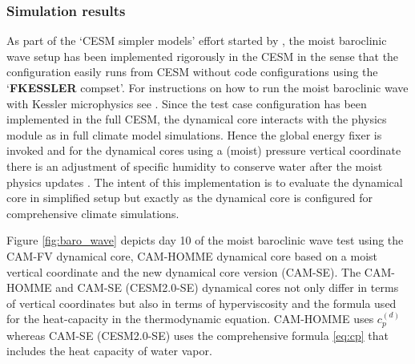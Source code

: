 \documentclass{agujournal}
\begin{document}

\subsubsection{Simulation results}
As part of the `CESM simpler models' effort started by \citet{CESM_SIMPLER_MODELS}, the moist baroclinic wave setup has been implemented rigorously in the CESM in the sense that the configuration easily runs from CESM without code configurations using the `{\bf FKESSLER} compset'. For instructions on how to run the moist baroclinic wave with Kessler microphysics see \citet{FKESSLER}. Since the test case configuration has been implemented in the full CESM, the dynamical core interacts with the physics module as in full climate model simulations. Hence the global energy fixer is invoked \citep{WOHTTV2015JAMES} and for the dynamical cores using a (moist) pressure vertical coordinate there is an adjustment of specific humidity to conserve water after the moist physics updates \citep[see Section 3.1.6 in ][]{CAM5}. The intent of this implementation is to evaluate the dynamical core in simplified setup but exactly as the dynamical core is configured for comprehensive climate simulations.

Figure \ref{fig:baro_wave} depicts day 10 of the moist baroclinic wave test using the CAM-FV \citep[Finite-Volume; ][]{L2004MWR} dynamical core, CAM-HOMME dynamical core based on a moist vertical coordinate and the new dynamical core version (CAM-SE). The CAM-HOMME and CAM-SE (CESM2.0-SE) dynamical cores not only differ in terms of vertical coordinates but also in terms of hyperviscosity and the formula used for the heat-capacity in the thermodynamic equation. CAM-HOMME uses $c_p^{(d)}$ whereas CAM-SE (CESM2.0-SE) uses the comprehensive formula \eqref{eq:cp} that includes the heat capacity of water vapor.
\end{document}
